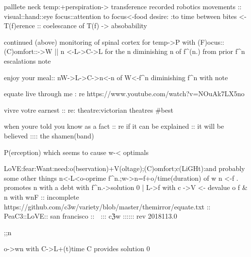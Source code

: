 {palllete
neck temp:+{perspiration}-> transference {}
recorded robotics movements :: visual::hand::eye focus::attention to focus<-food desire: :to {}
time between bites <- T(f){erence} ::
coelescance of T(f) -> absobability

continued (above) monitoring of spinal cortex for temp->P with (F)ocus::(C)omfort::->W || n <-L->C->L for the n diminishing n of f^(n.) from prior f^n escalations {note}

enjoy your meal:: nW->L->C->n<-n of W<-f^n diminishing f^n with {note}


equate live through me : re
https://www.youtube.com/watch?v=NOuAk7LX5no

vivre votre
earnest :: re: theatre:victorian theatres #best

when youre told you know as a fact :: re if it can be explained :: it will be believed :::: the shamen(band)

P(erception) which seems to cause w-< {optimals}



LoVE:fear:Want:need:o(bservation)+V(oltage);(C)omfort;c(LiGHt):and probably some other things
n<-L<o-o{prime f^n.;w->n=f+o/time(duration) of w n <-f . promotes n with a debt with f^n.}->{solution 0 | L->f with c ->V <- devalue o f & n with wnF :: {incomplete}}
https://github.com/c3w/variety/blob/master/themirror/equate.txt
:: PeaC3::LoVE:: san francisco :: 🌿 ::: cℨw :::::: rev 2018113.0

};;n

o->wn with C->L+(t){time} C provides {solution 0}

